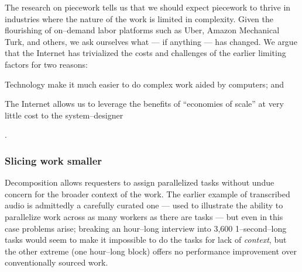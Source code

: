 \documentclass[trackingWork]{subfiles}
\begin{document}
The research on piecework tells us that
we should expect piecework to thrive in industries where
the nature of the work is limited in complexity.
Given the flourishing of on--demand labor platforms such as
Uber, Amazon Mechanical Turk, and others, we ask ourselves
what --- if anything --- has changed.
We argue that the Internet has trivialized the costs and challenges of the earlier limiting factors for two reasons:
\begin{inlinelist}
  \item Technology make it much easier to do complex work aided by computers; and %
  \item The Internet allows us to leverage the benefits of ``economies of scale'' at very little cost
        to the system--designer \cite{lessig2006code}
\end{inlinelist}.







\subsubsection{Slicing work smaller
}\label{sec:Slicing}

Decomposition allows requesters to assign parallelized tasks
without undue concern for the broader context of the work.
The earlier example of transcribed audio is admittedly a carefully curated one
--- used to illustrate the ability
to parallelize work across as many workers as there are tasks ---
but even in this case problems arise;
breaking an hour--long interview into
3,600 1--second--long tasks would seem to make it impossible to do the tasks
for lack of \textit{context},
but the other extreme (one hour--long block)
offers no performance improvement over conventionally sourced work.
\end{document}
